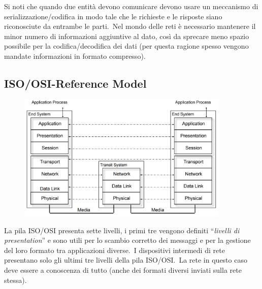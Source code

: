 Si noti che quando due entità devono comunicare devono usare un meccanismo di serializzazione/codifica in modo tale che le richieste e le risposte siano riconosciute da entrambe le parti.\
Nel mondo delle reti è necessario mantenere il minor numero di informazioni aggiuntive al dato, così da sprecare meno spazio possibile per la codifica/decodifica dei dati (per questa ragione spesso vengono mandate informazioni in formato compresso).\

\subsection{ISO/OSI-Reference Model}

\begin{figure}[H]
    \centering
    \includegraphics[width=0.9\textwidth]{immagini/ISO_OSI.png}
\end{figure}

\noindent La pila ISO/OSI presenta sette livelli, i primi tre vengono definiti ``\textit{livelli di presentation}'' e sono utili per lo scambio corretto dei messaggi e per la gestione del loro formato tra applicazioni diverse.\
I dispositivi intermedi di rete presentano solo gli ultimi tre livelli della pila ISO/OSI.\
La rete in questo caso deve essere a conoscenza di tutto (anche dei formati diversi inviati sulla rete stessa).

